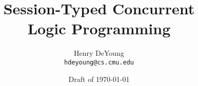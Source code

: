 \documentclass{hdeyoung-proposal}
\begin{document}
\title{Session-Typed Concurrent\\Logic Programming}
\author{Henry DeYoung\\\texttt{hdeyoung@cs.cmu.edu}}
\date{Draft of \today}
\maketitle


% 











% 


\printbibliography
\end{document}
